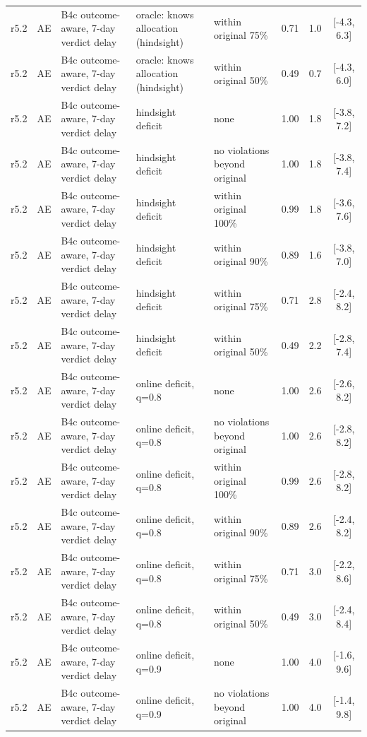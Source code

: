 \documentclass[10pt,onecolumn,letterpaper]{article}
\begin{document}
\begin{longtable}{lllp{4.2cm}p{3.4cm}ccc}
r5.2 & AE & B4c outcome-aware, 7-day verdict delay & oracle: knows allocation (hindsight) & within original 75\% & 0.71 & 1.0 & [-4.3, 6.3] \\
r5.2 & AE & B4c outcome-aware, 7-day verdict delay & oracle: knows allocation (hindsight) & within original 50\% & 0.49 & 0.7 & [-4.3, 6.0] \\
r5.2 & AE & B4c outcome-aware, 7-day verdict delay & hindsight deficit & none & 1.00 & 1.8 & [-3.8, 7.2] \\
r5.2 & AE & B4c outcome-aware, 7-day verdict delay & hindsight deficit & no violations beyond original & 1.00 & 1.8 & [-3.8, 7.4] \\
r5.2 & AE & B4c outcome-aware, 7-day verdict delay & hindsight deficit & within original 100\% & 0.99 & 1.8 & [-3.6, 7.6] \\
r5.2 & AE & B4c outcome-aware, 7-day verdict delay & hindsight deficit & within original 90\% & 0.89 & 1.6 & [-3.8, 7.0] \\
r5.2 & AE & B4c outcome-aware, 7-day verdict delay & hindsight deficit & within original 75\% & 0.71 & 2.8 & [-2.4, 8.2] \\
r5.2 & AE & B4c outcome-aware, 7-day verdict delay & hindsight deficit & within original 50\% & 0.49 & 2.2 & [-2.8, 7.4] \\
r5.2 & AE & B4c outcome-aware, 7-day verdict delay & online deficit, q=0.8 & none & 1.00 & 2.6 & [-2.6, 8.2] \\
r5.2 & AE & B4c outcome-aware, 7-day verdict delay & online deficit, q=0.8 & no violations beyond original & 1.00 & 2.6 & [-2.8, 8.2] \\
r5.2 & AE & B4c outcome-aware, 7-day verdict delay & online deficit, q=0.8 & within original 100\% & 0.99 & 2.6 & [-2.8, 8.2] \\
r5.2 & AE & B4c outcome-aware, 7-day verdict delay & online deficit, q=0.8 & within original 90\% & 0.89 & 2.6 & [-2.4, 8.2] \\
r5.2 & AE & B4c outcome-aware, 7-day verdict delay & online deficit, q=0.8 & within original 75\% & 0.71 & 3.0 & [-2.2, 8.6] \\
r5.2 & AE & B4c outcome-aware, 7-day verdict delay & online deficit, q=0.8 & within original 50\% & 0.49 & 3.0 & [-2.4, 8.4] \\
r5.2 & AE & B4c outcome-aware, 7-day verdict delay & online deficit, q=0.9 & none & 1.00 & 4.0 & [-1.6, 9.6] \\
r5.2 & AE & B4c outcome-aware, 7-day verdict delay & online deficit, q=0.9 & no violations beyond original & 1.00 & 4.0 & [-1.4, 9.8] \\

\end{longtable}
\end{document}
